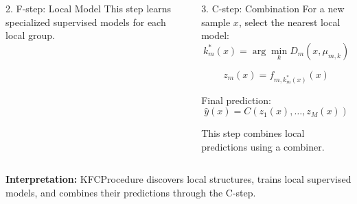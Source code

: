 \begin{frame}
\begin{columns}[T,onlytextwidth]
\begin{block}{2. F-step: Local Model}
            {\tiny
                This step learns specialized supervised models for each local group.
            }
        \end{block}


        \begin{block}{3. C-step: Combination}
            For a new sample \(x\), select the nearest local model:
            \[
                k_m^*(x)
                =
                \arg\min_k
                D_m(x,\mu_{m,k})
            \]

            \[
                z_m(x)
                =
                f_{m,k_m^*(x)}(x)
            \]

            Final prediction:
            \[
                \hat{y}(x)
                =
                C(z_1(x),\ldots,z_M(x))
            \]

            {\tiny
                This step combines local predictions using a combiner.
            }
        \end{block}

    \end{columns}

    \vspace{0.25cm}

    {\tiny
        \textbf{Interpretation:}
        KFCProcedure discovers local structures, trains local supervised models, and combines their predictions through the C-step.
        \cite{has2021kfc}
    }

\end{frame}

